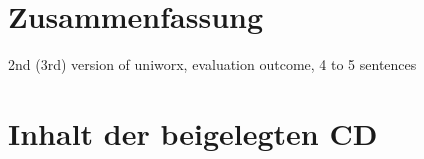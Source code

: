 \documentclass[11pt,a4paper,twoside,ngerman]{article}
\begin{document}
\clearpage
\section{Zusammenfassung} \label{sec:summary}
2nd (3rd) version of uniworx, evaluation outcome, 
4 to 5 sentences

\clearpage
\fancyhead[LE,RO,LO,RE]{} %
\section*{Inhalt der beigelegten CD}


\clearpage


\end{document}

